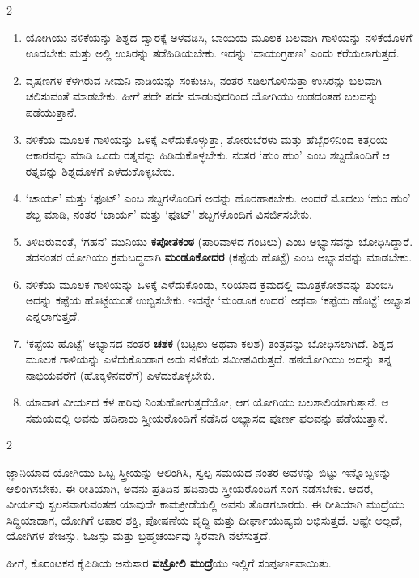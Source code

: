\begin{multicols}{2}
\begin{kan}

\begin{enumerate}[nosep]
\item[49.] ಯೋಗಿಯು ನಳಿಕೆಯನ್ನು ಶಿಶ್ನದ ದ್ವಾರಕ್ಕೆ ಅಳವಡಿಸಿ, ಬಾಯಿಯ ಮೂಲಕ ಬಲವಾಗಿ ಗಾಳಿಯನ್ನು ನಳಿಕೆಯೊಳಗೆ ಊದಬೇಕು ಮತ್ತು ಅಲ್ಲಿ ಉಸಿರನ್ನು ತಡೆಹಿಡಿಯಬೇಕು. ಇದನ್ನು ‘ವಾಯುಗ್ರಹಣ’ ಎಂದು ಕರೆಯಲಾಗುತ್ತದೆ.
\item[50.] ವೃಷಣಗಳ ಕೆಳಗಿರುವ ಸೀಮನಿ ನಾಡಿಯನ್ನು ಸಂಕುಚಿಸಿ, ನಂತರ ಸಡಿಲಗೊಳಿಸುತ್ತಾ ಉಸಿರನ್ನು ಬಲವಾಗಿ ಚಲಿಸುವಂತೆ ಮಾಡಬೇಕು. ಹೀಗೆ ಪದೇ ಪದೇ ಮಾಡುವುದರಿಂದ ಯೋಗಿಯು ಉಡದಂತಹ ಬಲವನ್ನು ಪಡೆಯುತ್ತಾನೆ.
\item[51.] ನಳಿಕೆಯ ಮೂಲಕ ಗಾಳಿಯನ್ನು ಒಳಕ್ಕೆ ಎಳೆದುಕೊಳ್ಳುತ್ತಾ, ತೋರುಬೆರಳು ಮತ್ತು ಹೆಬ್ಬೆರಳಿನಿಂದ ಕತ್ತರಿಯ ಆಕಾರವನ್ನು ಮಾಡಿ ಒಂದು ರತ್ನವನ್ನು ಹಿಡಿದುಕೊಳ್ಳಬೇಕು. ನಂತರ ‘ಹುಂ ಹುಂ’ ಎಂಬ ಶಬ್ದದೊಂದಿಗೆ ಆ ರತ್ನವನ್ನು ಶಿಶ್ನದೊಳಗೆ ಎಳೆದುಕೊಳ್ಳಬೇಕು.
\item[52.] ‘ಚಾರ್ಯ’ ಮತ್ತು ‘ಫೂಟ್’ ಎಂಬ ಶಬ್ದಗಳೊಂದಿಗೆ ಅದನ್ನು ಹೊರಹಾಕಬೇಕು. ಅಂದರೆ ಮೊದಲು ‘ಹುಂ ಹುಂ’ ಶಬ್ದ ಮಾಡಿ, ನಂತರ ‘ಚಾರ್ಯ’ ಮತ್ತು ‘ಫೂಟ್’ ಶಬ್ದಗಳೊಂದಿಗೆ ವಿಸರ್ಜಿಸಬೇಕು.
\item[53.] ತಿಳಿದಿರುವಂತೆ, ‘ಗಹನ’ ಮುನಿಯು \textbf{ಕಪೋತಕಂಠ} (ಪಾರಿವಾಳದ ಗಂಟಲು) ಎಂಬ ಅಭ್ಯಾಸವನ್ನು ಬೋಧಿಸಿದ್ದಾರೆ. ತದನಂತರ ಯೋಗಿಯು ಕ್ರಮಬದ್ಧವಾಗಿ \textbf{ಮಂಡೂಕೋದರ} (ಕಪ್ಪೆಯ ಹೊಟ್ಟೆ) ಎಂಬ ಅಭ್ಯಾಸವನ್ನು ಮಾಡಬೇಕು.
\item[54.] ನಳಿಕೆಯ ಮೂಲಕ ಗಾಳಿಯನ್ನು ಒಳಕ್ಕೆ ಎಳೆದುಕೊಂಡು, ಸರಿಯಾದ ಕ್ರಮದಲ್ಲಿ ಮೂತ್ರಕೋಶವನ್ನು  ತುಂಬಿಸಿ ಅದನ್ನು ಕಪ್ಪೆಯ ಹೊಟ್ಟೆಯಂತೆ ಉಬ್ಬಿಸಬೇಕು. ಇದನ್ನೇ ‘ಮಂಡೂಕ ಉದರ’ ಅಥವಾ ‘ಕಪ್ಪೆಯ ಹೊಟ್ಟೆ’ ಅಭ್ಯಾಸ ಎನ್ನಲಾಗುತ್ತದೆ.
\item[55.] ‘ಕಪ್ಪೆಯ ಹೊಟ್ಟೆ’ ಅಭ್ಯಾಸದ ನಂತರ \textbf{ಚಶಕ} (ಬಟ್ಟಲು ಅಥವಾ ಕಲಶ) ತಂತ್ರವನ್ನು ಬೋಧಿಸಲಾಗಿದೆ. ಶಿಶ್ನದ ಮೂಲಕ ಗಾಳಿಯನ್ನು ಎಳೆದುಕೊಂಡಾಗ ಅದು ನಳಿಕೆಯ ಸಮೀಪವಿರುತ್ತದೆ. ಹಠಯೋಗಿಯು ಅದನ್ನು ತನ್ನ ನಾಭಿಯವರೆಗೆ (ಹೊಕ್ಕಳಿನವರೆಗೆ) ಎಳೆದುಕೊಳ್ಳಬೇಕು.
\item[56.] ಯಾವಾಗ ವೀರ್ಯದ ಕೆಳ ಹರಿವು ನಿಂತುಹೋಗುತ್ತದೆಯೋ, ಆಗ ಯೋಗಿಯು ಬಲಶಾಲಿಯಾಗುತ್ತಾನೆ. ಆ ಸಮಯದಲ್ಲಿ ಅವನು ಹದಿನಾರು ಸ್ತ್ರೀಯರೊಂದಿಗೆ ನಡೆಸಿದ ಅಭ್ಯಾಸದ ಪೂರ್ಣ ಫಲವನ್ನು ಪಡೆಯುತ್ತಾನೆ.
\end{enumerate}
\end{kan}
\end{multicols}

\begin{kan}


\begin{multicols}{2}

ಜ್ಞಾನಿಯಾದ ಯೋಗಿಯು ಒಬ್ಬ ಸ್ತ್ರೀಯನ್ನು ಆಲಿಂಗಿಸಿ, ಸ್ವಲ್ಪ ಸಮಯದ ನಂತರ ಅವಳನ್ನು ಬಿಟ್ಟು ಇನ್ನೊಬ್ಬಳನ್ನು ಆಲಿಂಗಿಸಬೇಕು. ಈ ರೀತಿಯಾಗಿ, ಅವನು ಪ್ರತಿದಿನ ಹದಿನಾರು ಸ್ತ್ರೀಯರೊಂದಿಗೆ ಸಂಗ ನಡೆಸಬೇಕು. ಆದರೆ, ವೀರ್ಯವು ಸ್ಖಲನವಾಗುವಂತಹ ಯಾವುದೇ ಕಾಮಕ್ರೀಡೆಯಲ್ಲಿ ಅವನು ತೊಡಗಬಾರದು. ಈ ರೀತಿಯಾಗಿ ಮುದ್ರೆಯು ಸಿದ್ಧಿಯಾದಾಗ, ಯೋಗಿಗೆ ಅಪಾರ ಶಕ್ತಿ, ಪೋಷಣೆಯ ವೃದ್ಧಿ ಮತ್ತು ದೀರ್ಘಾಯುಷ್ಯವು ಲಭಿಸುತ್ತದೆ. ಅಷ್ಟೇ ಅಲ್ಲದೆ, ಯೋಗಿಗಳ ತೇಜಸ್ಸು, ಓಜಸ್ಸು ಮತ್ತು ಬ್ರಹ್ಮಚರ್ಯವು ಸ್ಥಿರವಾಗಿ ನೆಲೆಸುತ್ತದೆ.

ಹೀಗೆ, ಕೊರಂಟಕನ ಕೈಪಿಡಿಯ ಅನುಸಾರ \textbf{ವಜ್ರೋಲಿ ಮುದ್ರೆ}ಯು ಇಲ್ಲಿಗೆ ಸಂಪೂರ್ಣವಾಯಿತು.

\end{multicols}
\end{kan}
\vskip 1cm

\pushpika

